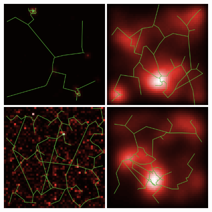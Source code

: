 \begin{figure}
\centering
\noindent   \includegraphics[width=0.49\textwidth]{Figures/CorrelatedSyntheticData/configs/1_param71861_seed0}
   \includegraphics[width=0.49\textwidth]{Figures/CorrelatedSyntheticData/configs/2_param71913_seed10}\\
   \includegraphics[width=0.49\textwidth]{Figures/CorrelatedSyntheticData/configs/3_param71918_seed0}
   \includegraphics[width=0.49\textwidth]{Figures/CorrelatedSyntheticData/configs/4_param71945_seed0}

\end{figure}

